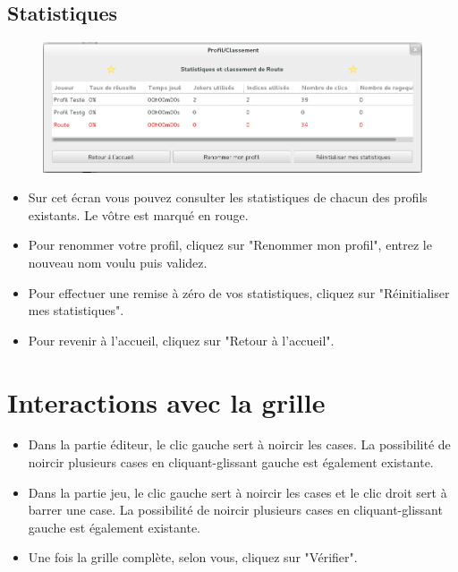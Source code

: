 \documentclass[a4paper, 12pt, twoside]{article}
\begin{document}
\subsection{Statistiques}

\begin{figure}[H]
  \center
  \includegraphics[scale=0.4]{stats.png}
  \label{stats}
\end{figure}

\begin{itemize}\setlength{\itemsep}{1mm}
 \item Sur cet écran vous pouvez consulter les statistiques de chacun des profils existants. Le vôtre est marqué en rouge.
 \item Pour renommer votre profil, cliquez sur "Renommer mon profil", entrez le nouveau nom voulu puis validez.
 \item Pour effectuer une remise à zéro de vos statistiques, cliquez sur "Réinitialiser mes statistiques".
 \item Pour revenir à l'accueil, cliquez sur "Retour à l'accueil".
\end{itemize}

\section{Interactions avec la grille}

\begin{itemize}\setlength{\itemsep}{1mm}
 \item Dans la partie éditeur, le clic gauche sert à noircir les cases. La possibilité de noircir plusieurs cases en cliquant-glissant gauche est également existante. 
 \item Dans la partie jeu, le clic gauche sert à noircir les cases et le clic droit sert à barrer une case. La possibilité de noircir plusieurs cases en cliquant-glissant gauche est également existante. 
 \item Une fois la grille complète, selon vous, cliquez sur "Vérifier".
\end{itemize}
\end{document}
